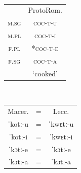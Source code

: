 \documentclass[output=paper,colorlinks,citecolor=brown]{langscibook}
\begin{document}
\bigskip

\noindent \begin{minipage}{\textwidth}
	\setlength{\columnsep}{-40pt}
	\begin{multicols}{3}
		\begin{exe}
			\ex \label{04ex19}
			\begin{xlist}
				\ex \label{04ex19a} \phantom{x} \vspace*{0.2cm} \\
				\hspace*{-1.2cm}\begin{tabularx}{\textwidth}{cc}
					& ProtoRom. \\
					\cline{2-2}
					\textsc{m.sg} & \multicolumn{1}{|c|}{\textsc{coc-t-u}} \\
					\cline{2-2}
					\textsc{m.pl} & \multicolumn{1}{|c|}{\textsc{coc-t-i}} \\
					\cline{2-2}
					\textsc{f.pl} & \multicolumn{1}{|c|}{\hspace{-0.13cm}\textsc{*coc-t-e}} \\
					\cline{2-2}
					\textsc{f.sg} & \multicolumn{1}{|c|}{\textsc{coc-t-a}} \\
					\cline{2-2}
					& \multicolumn{1}{c}{\rule{0pt}{0.5cm}‘cooked’} \\
				\end{tabularx}
			
			\columnbreak
				
				\ex \label{04ex19b} \phantom{x} \vspace*{0.2cm} \\
				\hspace*{-1cm}\begin{tabularx}{\textwidth}{ccc}
					\rule{0pt}{2.5ex} Macer. & = & Lecc. \\
					\cline{1-1}\cline{3-3}
					\multicolumn{1}{|c|}{ˈkotː-u} & = & \multicolumn{1}{|c|}{ˈkwɛtː-u} \\
					\cline{1-1}\cline{3-3}
					\multicolumn{1}{|c|}{ˈkotː-i} & = & \multicolumn{1}{|c|}{ˈkwɛtː-i} \\
					\cline{1-1}\cline{3-3}
					\multicolumn{1}{|c|}{ˈkɔtː-e} & = & \multicolumn{1}{|c|}{ˈkɔtː-e} \\
					\cline{1-1}\cline{3-3}
					\multicolumn{1}{|c|}{ˈkɔtː-a} & = & \multicolumn{1}{|c|}{ˈkɔtː-a} \\
					\cline{1-1}\cline{3-3}
				\end{tabularx}
			
			\columnbreak
				

\end{xlist}
\end{exe}
\end{multicols}
\end{minipage}
\end{document}
